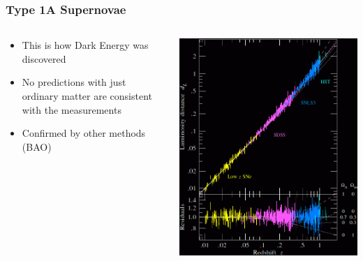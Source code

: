 \documentclass{beamer}
\begin{document}
\frame
{

    \frametitle{Type 1A Supernovae}


    \begin{columns}
        \begin{column}{0.5\textwidth}
            \begin{itemize}

                \item This is how Dark Energy was discovered 


                \item No predictions with just ordinary matter are consistent
                    with the measurements

                \item Confirmed by other methods (BAO)

            \end{itemize}

        \end{column}
        \begin{column}{0.5\textwidth}
            \begin{center}
                \includegraphics[width=\textwidth]{snhubblediag_betoule_inv.png}
            \end{center}
        \end{column}

    \end{columns}


}
\end{document}
